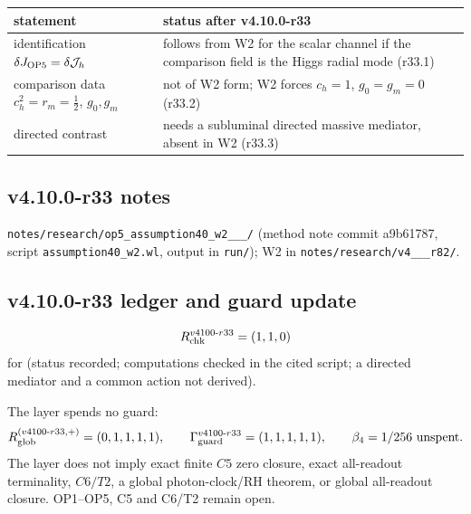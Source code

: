 \begin{center}
\small
\begin{tabular}{@{}>{\raggedright\arraybackslash}p{}>{\raggedright\arraybackslash}p{}@{}}
\toprule
statement & status after v4.10.0-r33\\
\midrule
identification \(\delta J_{\rm OP5}=\delta\mathcal J_h\) & follows from W2 for the scalar channel if the comparison field is the Higgs radial mode (r33.1)\\
comparison data \(c_h^2=r_m=\tfrac12\), \(g_0,g_m\) & not of W2 form; W2 forces \(c_h=1\), \(g_0=g_m=0\) (r33.2)\\
directed contrast & needs a subluminal directed massive mediator, absent in W2 (r33.3)\\
\bottomrule
\end{tabular}
\end{center}

\subsection*{v4.10.0-r33 notes}
\label{subsec:v4100-r33-notes}

\texttt{notes/\allowbreak research/\allowbreak op5\_\allowbreak assumption40\_\allowbreak w2\_\_\_/} (method note commit a9b61787,
script \texttt{assumption40\_\allowbreak w2.wl}, output in \texttt{run/}); W2 in \texttt{notes/\allowbreak research/\allowbreak v4\_\_\_\allowbreak r82/}.

\subsection*{v4.10.0-r33 ledger and guard update}
\label{subsec:v4100-r33-ledger-guard}

\[
R_{\rm chk}^{v4100\text{-}r33}=(1,1,0)
\]
for (status recorded; computations checked in the cited script; a directed mediator and a common action not derived).

The layer spends no guard:
\[
R_{\rm glob}^{(v4100\text{-}r33,+)}=(0,1,1,1,1),
\qquad
\Gamma_{\rm guard}^{v4100\text{-}r33}=(1,1,1,1,1),
\qquad
\beta_4=1/256\ \text{unspent}.
\]
The layer does not imply exact finite \(C5\) zero closure, exact all-readout terminality, \(C6/T2\), a global photon-clock/RH theorem,
or global all-readout closure.  OP1--OP5, C5 and C6/T2 remain open.
